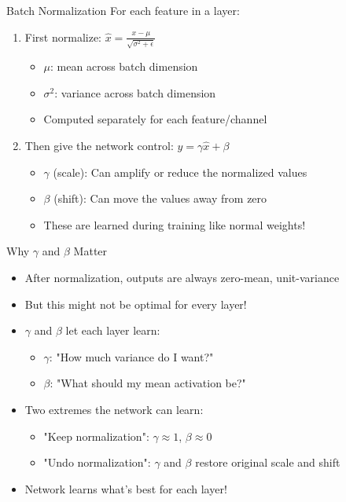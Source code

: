 \documentclass[10pt]{beamer}
\theoremstyle{remark}
\theoremstyle{definition}
\begin{document}
\begin{frame}{Batch Normalization}
    For each feature in a layer:
    \begin{enumerate}
        \item First normalize: $\hat{x} = \frac{x - \mu}{\sqrt{\sigma^2 + \epsilon}}$
        \begin{itemize}
            \item $\mu$: mean across batch dimension
            \item $\sigma^2$: variance across batch dimension
            \item Computed separately for each feature/channel
        \end{itemize}
        \vspace{0.5em}
        \item Then give the network control:
        $y = \gamma\hat{x} + \beta$
        \begin{itemize}
            \item $\gamma$ (scale): Can amplify or reduce the normalized values
            \item $\beta$ (shift): Can move the values away from zero
            \item These are learned during training like normal weights!
        \end{itemize}
        
    \end{enumerate}
\end{frame}

\begin{frame}{Why $\gamma$ and $\beta$ Matter}
    \begin{itemize}
        \item After normalization, outputs are always zero-mean, unit-variance
        \item But this might not be optimal for every layer!
        \item $\gamma$ and $\beta$ let each layer learn:
        \begin{itemize}
            \item $\gamma$: "How much variance do I want?"
            \item $\beta$: "What should my mean activation be?"
        \end{itemize}
        \item Two extremes the network can learn:
        \begin{itemize}
            \item "Keep normalization": $\gamma \approx 1$, $\beta \approx 0$
            \item "Undo normalization": $\gamma$ and $\beta$ restore original scale and shift
        \end{itemize}
        \item Network learns what's best for each layer!
    \end{itemize}
\end{frame}
\end{document}
